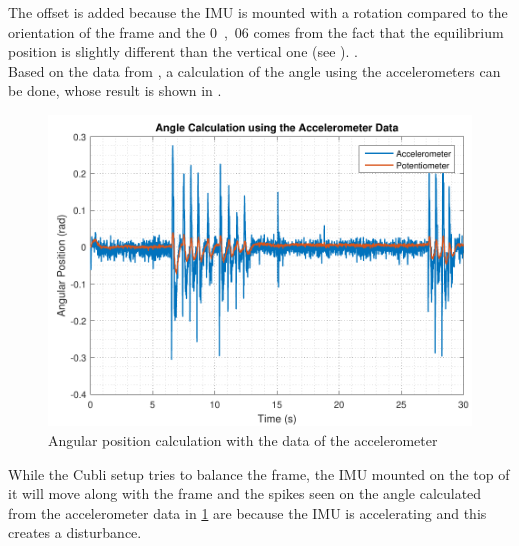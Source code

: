The offset is added because the IMU is mounted with a \si{} rotation compared to the orientation of the frame and the \si{0,06} comes from the fact that the equilibrium position is slightly different than the vertical one (see ). .\\
Based on the data from , a calculation of the angle using the accelerometers can be done, whose result is shown in .
%
\begin{figure}[H]
	\centering
	\includegraphics[scale=0.65]{figures/angleAcc}
	\caption{Angular position calculation with the data of the accelerometer}
	\label{angleAcc}
\end{figure}\vspace{-5mm}
%

While the Cubli setup tries to balance the frame, the IMU mounted on the top of it will move along with the frame and the spikes seen on the angle calculated from the accelerometer data in \ref{angleAcc} are because the IMU is accelerating and this creates a disturbance.

